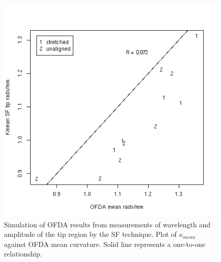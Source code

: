 %

\begin{figure}[!h]
  \centering
  \includegraphics[width=1.0\textwidth]{figofdasimsftipmean.png}
  \caption{Simulation of OFDA results from measurements of wavelength and amplitude of the tip region by the SF technique. Plot of $\kappa_{mean}$ against OFDA mean curvature. Solid line represents a one-to-one relationship.}
\label{fig:ofdasimsftipmean}
\end{figure}

%

